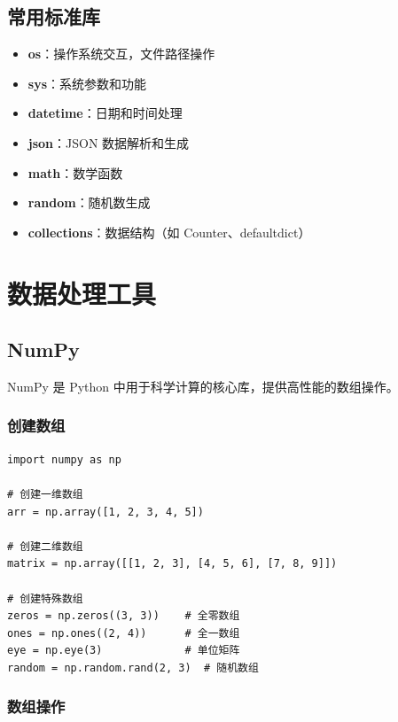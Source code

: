 \documentclass[12pt,UTF8]{ctexbook}
\begin{document}
\subsection{常用标准库}

\begin{itemize}[leftmargin=2cm]
    \item \textbf{os}：操作系统交互，文件路径操作
    \item \textbf{sys}：系统参数和功能
    \item \textbf{datetime}：日期和时间处理
    \item \textbf{json}：JSON 数据解析和生成
    \item \textbf{math}：数学函数
    \item \textbf{random}：随机数生成
    \item \textbf{collections}：数据结构（如 Counter、defaultdict）
\end{itemize}

\section{数据处理工具}
\label{sec:data_tools}

\subsection{NumPy}

NumPy 是 Python 中用于科学计算的核心库，提供高性能的数组操作。

\subsubsection{创建数组}

\begin{lstlisting}
import numpy as np

# 创建一维数组
arr = np.array([1, 2, 3, 4, 5])

# 创建二维数组
matrix = np.array([[1, 2, 3], [4, 5, 6], [7, 8, 9]])

# 创建特殊数组
zeros = np.zeros((3, 3))    # 全零数组
ones = np.ones((2, 4))      # 全一数组
eye = np.eye(3)             # 单位矩阵
random = np.random.rand(2, 3)  # 随机数组
\end{lstlisting}

\subsubsection{数组操作}
\end{document}
